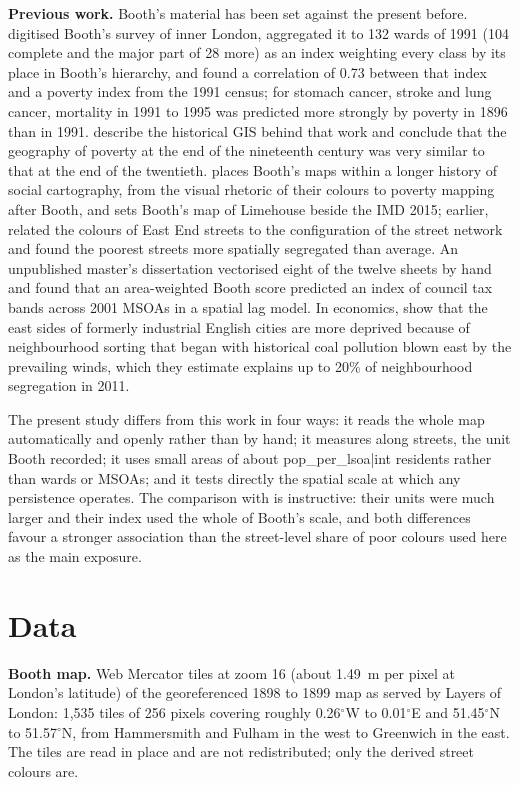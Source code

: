 \textbf{Previous work.} Booth's material has been set against the present before. \citet{dorling2000} digitised Booth's survey of inner London, aggregated it to 132 wards of 1991 (104 complete and the major part of 28 more) as an index weighting every class by its place in Booth's hierarchy, and found a correlation of 0.73 between that index and a poverty index from the 1991 census; for stomach cancer, stroke and lung cancer, mortality in 1991 to 1995 was predicted more strongly by poverty in 1896 than in 1991. \citet{orford2002} describe the historical GIS behind that work and conclude that the geography of poverty at the end of the nineteenth century was very similar to that at the end of the twentieth. \citet{vaughan2018} places Booth's maps within a longer history of social cartography, from the visual rhetoric of their colours to poverty mapping after Booth, and sets Booth's map of Limehouse beside the IMD 2015; earlier, \citet{vaughan2005} related the colours of East End streets to the configuration of the street network and found the poorest streets more spatially segregated than average. An unpublished master's dissertation \citep{low2019} vectorised eight of the twelve sheets by hand and found that an area-weighted Booth score predicted an index of council tax bands across 2001 MSOAs in a spatial lag model. In economics, \citet{heblich2021} show that the east sides of formerly industrial English cities are more deprived because of neighbourhood sorting that began with historical coal pollution blown east by the prevailing winds, which they estimate explains up to 20\% of neighbourhood segregation in 2011.

The present study differs from this work in four ways: it reads the whole map automatically and openly rather than by hand; it measures along streets, the unit Booth recorded; it uses small areas of about {{pop_per_lsoa|int}} residents rather than wards or MSOAs; and it tests directly the spatial scale at which any persistence operates. The comparison with \citet{dorling2000} is instructive: their units were much larger and their index used the whole of Booth's scale, and both differences favour a stronger association than the street-level share of poor colours used here as the main exposure.

\section{Data}\label{sec:data}

\textbf{Booth map.} Web Mercator tiles at zoom 16 (about 1.49~m per pixel at London's latitude) of the georeferenced 1898 to 1899 map as served by Layers of London: 1,535 tiles of 256 pixels covering roughly 0.26$^\circ$W to 0.01$^\circ$E and 51.45$^\circ$N to 51.57$^\circ$N, from Hammersmith and Fulham in the west to Greenwich in the east. The tiles are read in place and are not redistributed; only the derived street colours are.

